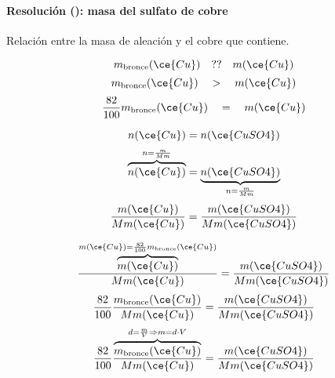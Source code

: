\begin{frame}
    \frametitle{\ejerciciocmd}
    \framesubtitle{Resolución (): masa del sulfato de cobre}
     Relación entre la masa de aleación y el cobre que contiene.
    \begin{overprint}
            $$
                m_{\text{bronce}}(\ce{Cu})
                \quad ??\quad 
                m(\ce{Cu})
            $$
            $$
                m_{\text{bronce}}(\ce{Cu})
                \quad >\quad 
                m(\ce{Cu})
            $$
            $$
                \frac{82}{100}m_{\text{bronce}}(\ce{Cu})
                \quad =\quad 
                m(\ce{Cu})
            $$
    \end{overprint}
     \begin{overprint}
              $$
                 n(\ce{Cu})
                 =
                 n(\ce{CuSO4})
             $$
              $$
                \overbrace{n(\ce{Cu})}^{n=\frac{m}{Mm}}
                =
                \underbrace{n(\ce{CuSO4})}_{n=\frac{m}{Mm}}
              $$
              $$
                  \frac{m(\ce{Cu})}{Mm(\ce{Cu})}
                  =
                  \frac{m(\ce{CuSO4})}{Mm(\ce{CuSO4})}
              $$
     \end{overprint}
      \begin{overprint}
             $$
                 \frac{\overbrace{m(\ce{Cu})}^{m(\ce{Cu})=\frac{82}{100}m_{\text{bronce}}(\ce{Cu})}}{Mm(\ce{Cu})}
                 =
                 \frac{m(\ce{CuSO4})}{Mm(\ce{CuSO4})}
             $$
             $$
                 \frac{82}{100}
                 \frac{m_{\text{bronce}}(\ce{Cu})}{Mm(\ce{Cu})}
                 =
                 \frac{m(\ce{CuSO4})}{Mm(\ce{CuSO4})}
             $$
             $$
                 \frac{82}{100}
                 \frac{\overbrace{m_{\text{bronce}}(\ce{Cu})}^{d=\frac{m}{V}\Rightarrow m=d\cdot V}}{Mm(\ce{Cu})}
                 =
                 \frac{m(\ce{CuSO4})}{Mm(\ce{CuSO4})}
             $$

\end{overprint}
\end{frame}

